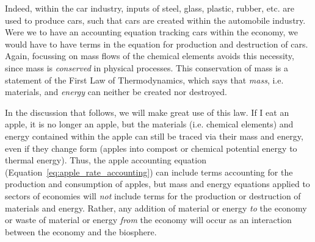 
Indeed, within the car industry, inputs of steel, glass, plastic, rubber, etc. are used
to produce cars, such that cars are created within the automobile industry. Were we to
have an accounting equation tracking cars within the economy, we would have to 
have terms in the equation for production and destruction of cars. Again, focussing on
mass flows of the chemical elements avoids this necessity, since mass is \emph{conserved} in
physical processes. This conservation of mass is a statement of the First Law of Thermodynamics, 
which says that \emph{mass}, i.e. materials, and \emph{energy}
can neither be created nor destroyed. 


In the discussion that follows, we will make great use 
of this law.
If I eat an apple, it is no longer an apple, 
but the materials (i.e. chemical elements) and energy contained
within the apple can still be traced via their mass and energy,
even if they change form (apples into compost or 
chemical potential energy to thermal energy).
Thus, the apple accounting equation
(Equation~\ref{eq:apple_rate_accounting}) can include
terms accounting for the production and consumption of apples, 
but mass and energy equations applied to 
sectors of economies will \emph{not} include terms for the 
production or destruction of materials and energy. 
Rather, any addition of material or energy \emph{to} the economy
or waste of material or energy \emph{from} the economy
will occur as an interaction between the economy and the biosphere.






